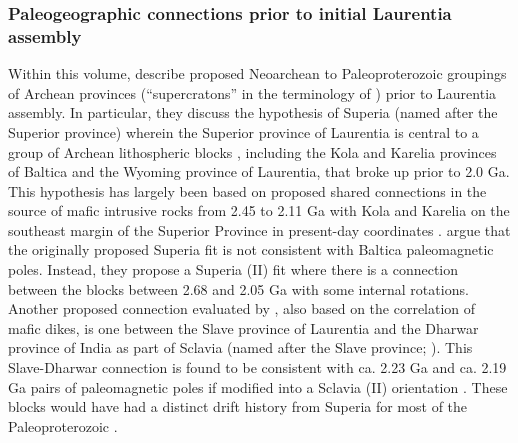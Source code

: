 \documentclass[twocolumn, switch]{article} %
\begin{document}
\subsubsection{Paleogeographic connections prior to initial Laurentia assembly}

Within this volume, \cite{Salminen2021a} describe proposed Neoarchean to Paleoproterozoic groupings of Archean provinces (``supercratons'' in the terminology of \citealp{Bleeker2003a}) prior to Laurentia assembly. In particular, they discuss the hypothesis of Superia (named after the Superior province) wherein the Superior province of Laurentia is central to a group of Archean lithospheric blocks \citep{Bleeker2006a}, including the Kola and Karelia provinces of Baltica and the Wyoming province of Laurentia, that broke up prior to 2.0 Ga. This hypothesis has largely been based on proposed shared connections in the source of mafic intrusive rocks from 2.45 to 2.11 Ga with Kola and Karelia on the southeast margin of the Superior Province in present-day coordinates \citep{Davey2020a}. \cite{Salminen2021a}  argue that the originally proposed Superia fit is not consistent with Baltica paleomagnetic poles. Instead, they propose a Superia (II) fit where there is a connection between the blocks between 2.68 and 2.05 Ga with some internal rotations. Another proposed connection evaluated by \cite{Salminen2021a}, also based on the correlation of mafic dikes, is one between the Slave province of Laurentia and the Dharwar province of India \citep{French2010a} as part of Sclavia (named after the Slave province; \citealp{Bleeker2003a}). This Slave-Dharwar connection is found to be consistent with ca. 2.23 Ga and ca. 2.19 Ga pairs of paleomagnetic poles if modified into a Sclavia (II) orientation \citep{Salminen2021a}. These blocks would have had a distinct drift history from Superia for most of the Paleoproterozoic \citep{Salminen2021a}.
\end{document}
